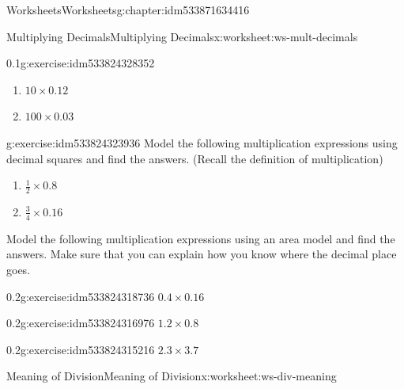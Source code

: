 \documentclass[twoside,11pt,]{book}
\begin{document}
\begin{chapterptx}{Worksheets}{}{Worksheets}{}{}{g:chapter:idm533871634416}
\begin{worksheet-section-numberless}{Multiplying Decimals}{}{Multiplying Decimals}{}{}{x:worksheet:ws-mult-decimals}
\begin{divisionexercise}{3}{}{0.1}{g:exercise:idm533824328352}
\begin{enumerate}[label=(\alph*)]
\item{}\(10 \times 0.12 \)%
\item{}\(100 \times 0.03 \)%
\end{enumerate}
\end{divisionexercise}%
\begin{divisionexercise}{4}{}{}{g:exercise:idm533824323936}%
Model the following multiplication expressions using decimal squares and find the answers. (Recall the definition of multiplication)%
%
\begin{enumerate}[label=(\alph*)]
\item{}\(\frac{1}{2} \times 0.8 \)%
\item{}\(\frac{3}{4} \times 0.16 \)%
\end{enumerate}
\end{divisionexercise}%
\clearpage
\begin{introduction}{}%
Model the following multiplication expressions using an area model and find the answers.  Make sure that you can explain how you know where the decimal place goes.%
\end{introduction}%
\begin{divisionexercise}{5}{}{0.2}{g:exercise:idm533824318736}%
\(0.4 \times 0.16\)%
\end{divisionexercise}%
\begin{divisionexercise}{6}{}{0.2}{g:exercise:idm533824316976}%
\(1.2 \times 0.8\)%
\end{divisionexercise}%
\begin{divisionexercise}{7}{}{0.2}{g:exercise:idm533824315216}%
\(2.3 \times 3.7 \)%
\end{divisionexercise}%
\end{worksheet-section-numberless}
\restoregeometry
%
%
\typeout{************************************************}
\typeout{************************************************}
%
\begin{worksheet-section-numberless}{Meaning of Division}{}{Meaning of Division}{}{}{x:worksheet:ws-div-meaning}
\begin{introduction}{}%
\begin{sidebyside}{1}{0}{0}{0}%
\begin{sbspanel}{1}%

\end{sbspanel}
\end{sidebyside}
\end{introduction}
\end{worksheet-section-numberless}
\end{chapterptx}
\end{document}

